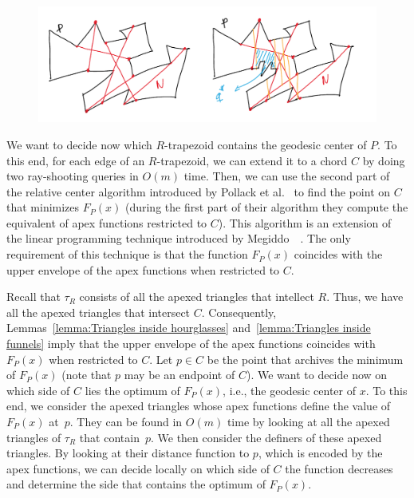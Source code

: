 \documentclass[a4paper,UKenglish]{lipics}
\newcommand{\F}[2]{\ensuremath{F_{\scriptscriptstyle #1}(#2)}}
\begin{document}
\begin{figure}[tb]
\centering
\includegraphics[width=1\textwidth]{img/CuttingOfChords.pdf}
\caption{\small }
\label{fig:Cutting of Chords}
\end{figure}

We want to decide now which $R$-trapezoid contains the geodesic center of $P$. 
To this end, for each edge of an $R$-trapezoid, we can extend it to a chord $C$ by doing two ray-shooting queries in $O(m)$ time. Then, we can use the second part of the relative center algorithm introduced by Pollack et al.~\cite[Section~3]{pollackComputingCenter} to find the point on $C$ that minimizes $\F{P}{x}$ (during the first part of their algorithm they compute the equivalent of apex functions restricted to $C$).
This algorithm is an extension of the linear programming technique introduced by Megiddo~~\cite{megiddo1982linear}. 
The only requirement of this technique is that the function $\F{P}{x}$ coincides with the upper envelope of the apex functions when restricted to $C$.

Recall that $\tau_R$ consists of all the apexed triangles that intellect $R$. 
Thus, we have all the apexed triangles that intersect $C$. Consequently, Lemmas~\ref{lemma:Triangles inside hourglasses} and~\ref{lemma:Triangles inside funnels} imply that the upper envelope of the apex functions coincides with $\F{P}{x}$ when restricted to $C$.
Let $p\in C$ be the point that archives the minimum of $\F{P}{x}$ (note that $p$ may be an endpoint of $C$). 
We want to decide now on which side of $C$ lies the optimum of $\F{P}{x}$, i.e., the geodesic center of $x$. 
To this end, we consider the apexed triangles whose apex functions define the value of $\F{P}{x}$ at~$p$. 
They can be found in $O(m)$ time by looking at all the apexed triangles of $\tau_R$ that contain~$p$. 
We then consider the definers of these apexed triangles. By looking at their distance function to $p$, which is encoded by the apex functions, we can decide locally on which side of $C$ the function decreases and determine the side that contains the optimum of $\F{P}{x}$.
\end{document}
